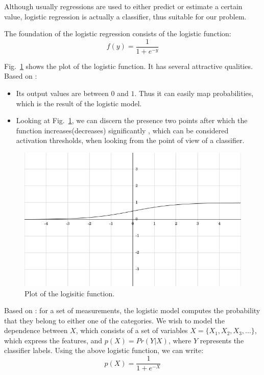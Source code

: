 Although usually regressions are used to either predict or estimate a certain value, logistic regression is actually a classifier, thus suitable for our problem. 

The foundation of the logistic regression consists of the logistic function:
\begin{equation*}
f(y) = \frac{1}{1+e^{-y}}
\end{equation*}

Fig.~\ref{pic:logit} shows the plot of the logistic function. It has several attractive qualities. Based on \cite{kleinbaum2010logistic}:

\begin{itemize}
  \item Its output values are between $0$ and $1$. Thus it can easily map probabilities, which is the result of the logistic model.
  \item Looking at Fig.~\ref{pic:logit}, we can discern the presence two points after which the function increases(decreases) significantly , which can be considered activation thresholds, when looking from the point of view of a classifier.  
\end{itemize}

\begin{figure}[h]
	\begin{center}
		\includegraphics[scale=0.5]{figures/logit.png}
	\end{center}
	
	\caption{Plot of the logisitic function.}
	\label{pic:logit}

\end{figure}

Based on \cite{kleinbaum2010logistic,logmodel1,statistics}: for a set of measurements, the logistic model computes the probability that they belong to either one of the categories. We wish to model the dependence between $X$, which consists of a set of variables $X = \lbrace X_1,X_2,X_3,... \rbrace $, which express the features, and $p(X) = Pr(Y \vert X)$, where $Y$ represents the classifier labels. Using the above logistic function, we can write:
\begin{equation*}
p(X) = \frac{1}{1+e^{-X}}
\end{equation*}


